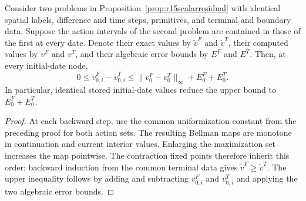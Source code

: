 \begin{corollary}
\label{cor:r15scalartube}
Consider two problems in Proposition~\ref{prop:r15scalarresidual} with
identical spatial labels, difference and time steps, primitives, and terminal
and boundary data.  Suppose the action intervals of the second problem are
contained in those of the first at every date.  Denote their exact values by
$\widetilde v^F$ and $\widetilde v^T$, their computed values by $v^F$ and
$v^T$, and their algebraic error bounds by $E^F$ and $E^T$.  Then, at every
initial-date node,
\[
 0\le\widetilde v^F_{0,i}-\widetilde v^T_{0,i}
 \le \|v^F_0-v^T_0\|_\infty+E^F_0+E^T_0.
\]
In particular, identical stored initial-date values reduce the upper bound
to $E^F_0+E^T_0$.
\end{corollary}

\begin{proof}
At each backward step, use the common uniformization constant from the
preceding proof for both action sets.  The resulting Bellman maps are
monotone in continuation and current interior values.  Enlarging the
maximization set increases the map pointwise.  The contraction fixed points
therefore inherit this order; backward induction from the common terminal
data gives $\widetilde v^F\ge\widetilde v^T$.  The upper inequality follows
by adding and subtracting $v^F_{0,i}$ and $v^T_{0,i}$ and applying the two
algebraic error bounds.
\end{proof}
